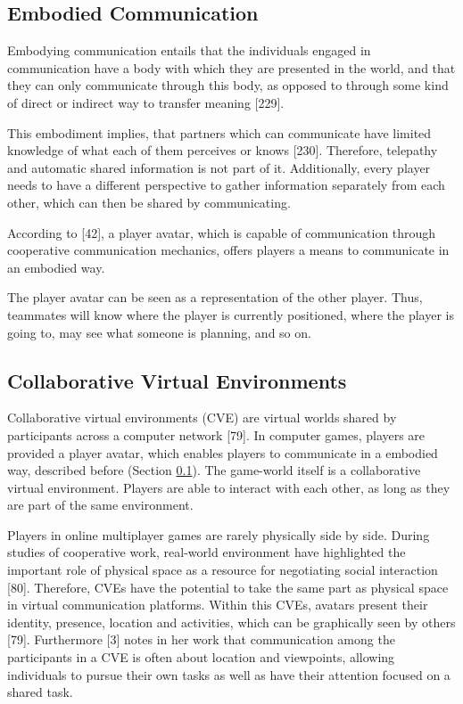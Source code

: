 \subsection{Embodied Communication}
\label{section:Embodied Communication}

Embodying communication entails that the individuals engaged in communication have a body with which they are presented in the world, and that they can only communicate through this body, as opposed to through some kind of direct or indirect way to transfer meaning \autocite{Galantucci2012TheHumans}[229].

This embodiment implies, that partners which can communicate have limited knowledge of what each of them perceives or knows \autocite{Galantucci2012TheHumans}[230]. Therefore, telepathy and automatic shared information is not part of it. Additionally, every player needs to have a different perspective to gather information separately from each other, which can then be shared by communicating. 

According to \textcite{Vaddi2016Investigating2}[42], a player avatar, which is capable of communication through cooperative communication mechanics, offers players a means to communicate in an embodied way.

The player avatar can be seen as a representation of the other player. Thus, teammates will know where the player is currently positioned, where the player is going to, may see what someone is planning, and so on.


\subsection{Collaborative Virtual Environments}
\label{section:Collaborative Virtual Environments}

Collaborative virtual environments (CVE) are virtual worlds shared by participants across a computer network \autocite{Benford2001CollaborativeEnvironments}[79]. In computer games, players are provided a player avatar, which enables players to communicate in a embodied way, described before (Section \ref{section:Embodied Communication}). The game-world itself is a collaborative virtual environment. Players are able to interact with each other, as long as they are part of the same environment.

Players in online multiplayer games are rarely physically side by side. During studies of cooperative work, real-world environment have highlighted the important role of physical space as a resource for negotiating social interaction \autocite{Benford2001CollaborativeEnvironments}[80]. Therefore, CVEs have the potential to take the same part as physical space in virtual communication platforms.
Within this CVEs, avatars present their identity, presence, location and activities, which can be graphically seen by others \autocite{Benford2001CollaborativeEnvironments}[79].
Furthermore \textcite{Maher2011DesignersEnvironments}[3] notes in her work that communication among the participants in a CVE is often about location and viewpoints, allowing individuals to pursue their own tasks as well as have their attention focused on a shared task.